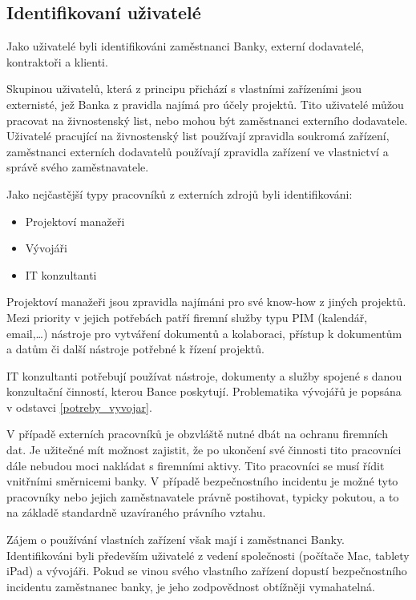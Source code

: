 \subsection{Identifikovaní uživatelé}
Jako uživatelé byli identifikováni zaměstnanci Banky, externí dodavatelé, kontraktoři a klienti.

Skupinou uživatelů, která z principu přichází s vlastními zařízeními jsou externisté, jež Banka z pravidla najímá pro účely projektů. Tito uživatelé můžou pracovat na živnostenský list, nebo mohou být zaměstnanci externího dodavatele. Uživatelé pracující na živnostenský list používají zpravidla soukromá zařízení, zaměstnanci externích dodavatelů používají zpravidla zařízení ve vlastnictví a správě svého zaměstnavatele.

Jako nejčastější typy pracovníků z externích zdrojů byli identifikováni:
\begin{itemize}
    \item Projektoví manažeři
    \item Vývojáři
    \item IT konzultanti
\end{itemize}

Projektoví manažeři jsou zpravidla najímáni pro své know-how z jiných projektů. Mezi priority v jejich potřebách patří firemní služby typu PIM (kalendář, email,\ldots) nástroje pro vytváření dokumentů a kolaboraci, přístup k dokumentům a datům či další nástroje potřebné k řízení projektů. 

IT konzultanti potřebují používat nástroje, dokumenty a služby spojené s danou konzultační činností, kterou Bance poskytují. Problematika vývojářů je popsána v odstavci \ref{potreby_vyvojar}.

V případě externích pracovníků je obzvláště nutné dbát na ochranu firemních dat. Je užitečné mít možnost zajistit, že po ukončení své činnosti tito pracovníci dále nebudou moci nakládat s firemními aktivy. Tito pracovníci se musí řídit vnitřními směrnicemi banky. V případě bezpečnostního incidentu je možné tyto pracovníky nebo jejich zaměstnavatele právně postihovat, typicky pokutou, a to na základě standardně uzavíraného právního vztahu.

Zájem o používání vlastních zařízení však mají i zaměstnanci Banky. Identifikováni byli především uživatelé z vedení společnosti (počítače Mac, tablety iPad) a vývojáři. Pokud se vinou svého vlastního zařízení dopustí bezpečnostního incidentu zaměstnanec banky, je jeho zodpovědnost obtížněji vymahatelná.


